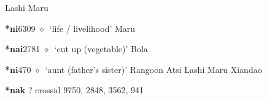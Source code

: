 \begin{list}{}{\leftmargin=1.5em \itemindent=-1.5em}
\hspace{1ex}
         Lashi 
\hspace{1ex}
         Maru 
  \item {\footnotesize \textbf{*ni}}{\tiny 6309}
\hspace{1ex}
         $\diamond$~`life / livelihood'
         Maru 
  \item {\footnotesize \textbf{*nai}}{\tiny 2781}
\hspace{1ex}
         $\diamond$~`cut up (vegetable)'
         Bola 
  \item {\footnotesize \textbf{*ni}}{\tiny 470}
\hspace{1ex}
         $\diamond$~`aunt (father's sister)'
         Rangoon 
\hspace{1ex}
         Atsi 
\hspace{1ex}
         Lashi 
\hspace{1ex}
         Maru 
\hspace{1ex}
         Xiandao 
  \end{list}
\item
\textbf{*nak}
?
  {\tiny crossid 9750, 2848, 3562, 941}
